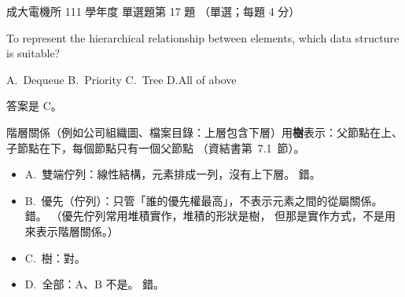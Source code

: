 \begin{pastexam}[label={px:ncku-111-ee-ds-17}]{成大電機所 111 學年度 單選題第 17 題}
（單選；每題 4 分）

To represent the hierarchical relationship between elements, which data structure is suitable?

A.~Dequeue \qquad B.~Priority \qquad C.~Tree \qquad D.All of above
\end{pastexam}

\begin{pastsoln}
答案是 C。

階層關係（例如公司組織圖、檔案目錄：上層包含下層）用\textbf{樹}表示：父節點在上、子節點在下，每個節點只有一個父節點
（資結書第~7.1~節）。
\begin{itemize}
\item A.~雙端佇列：線性結構，元素排成一列，沒有上下層。 錯。
\item B.~優先（佇列）：只管「誰的優先權最高」，不表示元素之間的從屬關係。 錯。 （優先佇列常用堆積實作，堆積的形狀是樹，
但那是實作方式，不是用來表示階層關係。）
\item C.~樹：對。
\item D.~全部：A、B 不是。 錯。
\end{itemize}
\end{pastsoln}

